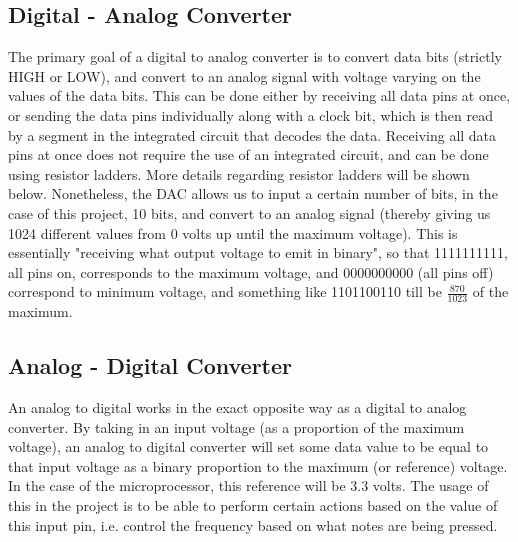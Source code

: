 
\subsection{Digital - Analog Converter}\label{subsec:digital---analog-converter}

The primary goal of a digital to analog converter is to convert data bits (strictly HIGH or LOW), and convert to an analog signal with voltage varying on the values of the data bits.
This can be done either by receiving all data pins at once, or sending the data pins individually along with a clock bit, which is then read by a segment in the integrated circuit that decodes the data.
Receiving all data pins at once does not require the use of an integrated circuit, and can be done using resistor ladders.
More details regarding resistor ladders will be shown below.
Nonetheless, the DAC allows us to input a certain number of bits, in the case of this project, 10 bits, and convert to an analog signal (thereby giving us 1024 different values from 0 volts up until the maximum voltage).
This is essentially "receiving what output voltage to emit in binary", so that 1111111111, all pins on, corresponds to the maximum voltage, and 0000000000 (all pins off) correspond to minimum voltage, and something like 1101100110 till be $\frac{870}{1023}$ of the maximum. 

\subsection{Analog - Digital Converter}\label{subsec:analog---digital-converter}

An analog to digital works in the exact opposite way as a digital to analog converter.
By taking in an input voltage (as a proportion of the maximum voltage), an analog to digital converter will set some data value to be equal to that input voltage as a binary proportion to the maximum (or reference) voltage.
In the case of the microprocessor, this reference will be 3.3 volts.
The usage of this in the project is to be able to perform certain actions based on the value of this input pin, i.e. control the frequency based on what notes are being pressed. 

